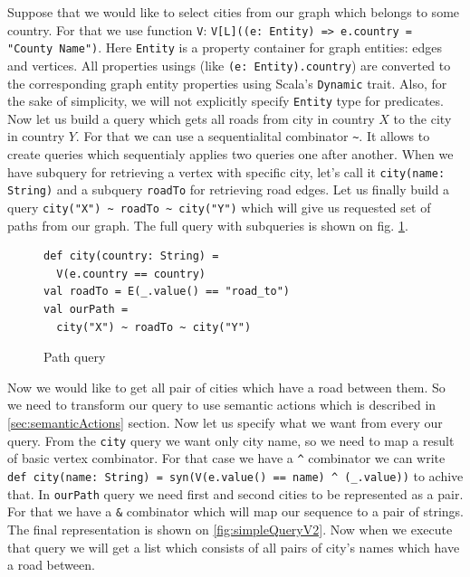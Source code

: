 Suppose that we would like to select cities from our graph which belongs to some country. 
For that we use function \lstinline{V}: \lstinline{V[L]((e: Entity) => e.country = "County Name")}.
Here \lstinline{Entity} is a property container for graph entities: edges and vertices. All properties usings (like \lstinline{(e: Entity).country}) are converted to the corresponding graph entity properties using Scala's \lstinline{Dynamic} trait.
Also, for the sake of simplicity, we will not explicitly specify \lstinline{Entity} type for predicates. 
Now let us build a query which gets all roads from city in country $X$ to the city in country $Y$. 
For that we can use a sequentialital combinator \lstinline{~}. 
It allows to create queries which sequentialy applies two queries one after another. 
When we have subquery for retrieving a vertex with specific city, let's call it \lstinline{city(name: String)} and a subquery \lstinline{roadTo} for retrieving road edges. 
Let us finally build a query \lstinline{city("X") ~ roadTo ~ city("Y")} which will give us requested set of paths from our graph.
The full query with subqueries is shown on fig. \ref{fig:simpleQuery}.

\begin{figure}[h]
\begin{lstlisting}
def city(country: String) =
  V(e.country == country)
val roadTo = E(_.value() == "road_to")
val ourPath = 
  city("X") ~ roadTo ~ city("Y")
\end{lstlisting}
\caption{Path query}
\label{fig:simpleQuery}
\end{figure}



Now we would like to get all pair of cities which have a road between them. 
So we need to transform our query to use semantic actions which is described in \ref{sec:semanticActions} section. 
Now let us specify what we want from every our query. 
From the \lstinline{city} query we want only city name, so we need to map a result of basic vertex combinator. 
For that case we have a \lstinline{^} combinator we can write \lstinline{def city(name: String) = syn(V(e.value() == name) ^ (_.value))} to achive that. 
In \lstinline{ourPath} query we need first and second cities to be represented as a pair. 
For that we have a \lstinline{&} combinator which will map our sequence to a pair of strings.
The final representation is shown on \ref{fig:simpleQueryV2}. 
Now when we execute that query we will get a list which consists of all pairs of city's names which have a road between.

